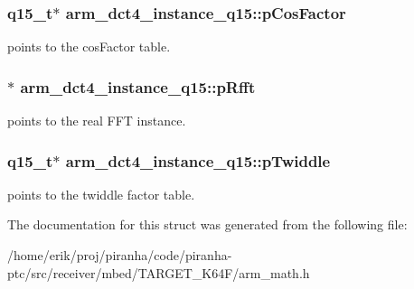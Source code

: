 \subsubsection[{\texorpdfstring{p\+Cos\+Factor}{pCosFactor}}]{\setlength{\rightskip}{0pt plus 5cm}q15\+\_\+t$\ast$ arm\+\_\+dct4\+\_\+instance\+\_\+q15\+::p\+Cos\+Factor}\hypertarget{structarm__dct4__instance__q15_ac76df681b1bd502fb4874c06f055dded}{}\label{structarm__dct4__instance__q15_ac76df681b1bd502fb4874c06f055dded}
points to the cos\+Factor table. 
\subsubsection[{\texorpdfstring{p\+Rfft}{pRfft}}]{$\ast$ arm\+\_\+dct4\+\_\+instance\+\_\+q15\+::p\+Rfft}\hypertarget{structarm__dct4__instance__q15_a11cf95c1cd9dd2dd5e4b81b8f88dc208}{}\label{structarm__dct4__instance__q15_a11cf95c1cd9dd2dd5e4b81b8f88dc208}
points to the real F\+FT instance. 
\subsubsection[{\texorpdfstring{p\+Twiddle}{pTwiddle}}]{\setlength{\rightskip}{0pt plus 5cm}q15\+\_\+t$\ast$ arm\+\_\+dct4\+\_\+instance\+\_\+q15\+::p\+Twiddle}\hypertarget{structarm__dct4__instance__q15_abc6c847e9f906781e1d5da40e9aafa76}{}\label{structarm__dct4__instance__q15_abc6c847e9f906781e1d5da40e9aafa76}
points to the twiddle factor table. 

The documentation for this struct was generated from the following file\+:\begin{DoxyCompactItemize}
\item 
/home/erik/proj/piranha/code/piranha-\/ptc/src/receiver/mbed/\+T\+A\+R\+G\+E\+T\+\_\+\+K64\+F/arm\+\_\+math.\+h\end{DoxyCompactItemize}
